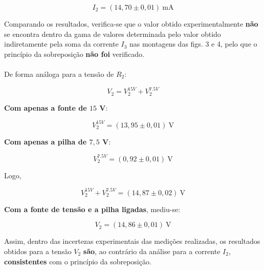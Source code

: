 \[
	I_2 = (14,70 \pm 0,01)\ \text{mA}
\]


Comparando os resultados, verifica-se que o valor obtido experimentalmente \textbf{não} se encontra dentro da gama de valores determinada pelo valor obtido indiretamente pela soma da corrente $I_3$ nas montagens das figs. 3 e 4, pelo que o princípio da sobreposição \textbf{não foi} verificado.\\
\\De forma análoga para a tensão de $R_2$:

\[
	V_2 = V_2^{15V} + V_2^{7.5V}
\]

\textbf{Com apenas a fonte de $15$ V}:

\[
	V_2^{15V} = (13,95 \pm 0,01)\ \text{V}
\]

\textbf{Com apenas a pilha de $7,5$ V}:

\[
	V_2^{7.5V} = (0,92 \pm 0,01)\ \text{V}
\]

Logo,

\[
	V_2^{15V} + V_2^{7.5V} =
	(14,87 \pm 0,02)\ \text{V}
\]

\textbf{Com a fonte de tensão e a pilha ligadas}, mediu-se:

\[
	V_2 = (14,86 \pm 0,01)\ \text{V}
\]

Assim, dentro das incertezas experimentais das medições realizadas, os resultados obtidos para a tensão $V_2$ \textbf{são}, ao contrário da análise para a corrente $I_2$, \textbf{consistentes} com o princípio da sobreposição.


